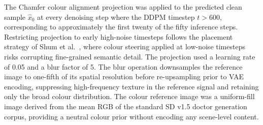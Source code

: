 The Chamfer colour alignment projection was applied to the predicted clean sample $\hat{x}_0$ at every denoising step where the DDPM timestep $t > 600$, corresponding to approximately the first twenty of the fifty inference steps. Restricting projection to early high-noise timesteps follows the placement strategy of Shum et al.\ \cite{Shum_2025_ColorAlignment}, where colour steering applied at low-noise timesteps risks corrupting fine-grained semantic detail. The projection used a learning rate of 0.05 and a blur factor of 5. The blur operation downsamples the reference image to one-fifth of its spatial resolution before re-upsampling prior to VAE encoding, suppressing high-frequency texture in the reference signal and retaining only the broad colour distribution. The colour reference image was a uniform-fill image derived from the mean RGB of the standard SD v1.5 doctor generation corpus, providing a neutral colour prior without encoding any scene-level content.